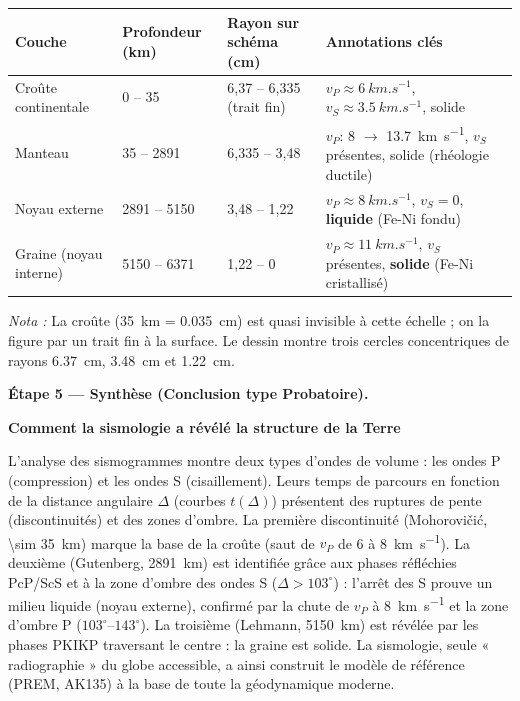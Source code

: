 \documentclass[11pt]{article}
\begin{document}
\begin{exoresolu}
\begin{center}
\begin{tabularx}{\linewidth}{|l|X|X|X|}
\hline
\rowcolor{popblueL} \textbf{Couche} & \textbf{Profondeur (km)} & \textbf{Rayon sur schéma (cm)} & \textbf{Annotations clés} \\
\hline
Croûte continentale & 0 -- 35 & 6,37 -- 6,335 (trait fin) & $v_P \approx \SI{6}{km.s^{-1}}$, $v_S \approx \SI{3,5}{km.s^{-1}}$, solide \\
\hline
Manteau & 35 -- 2891 & 6,335 -- 3,48 & $v_P$: \num{8} $\to$ \SI{13,7}{km.s^{-1}}, $v_S$ présentes, solide (rhéologie ductile) \\
\hline
Noyau externe & 2891 -- 5150 & 3,48 -- 1,22 & $v_P \approx \SI{8}{km.s^{-1}}$, $v_S = 0$, \textbf{liquide} (Fe-Ni fondu) \\
\hline
Graine (noyau interne) & 5150 -- 6371 & 1,22 -- 0 & $v_P \approx \SI{11}{km.s^{-1}}$, $v_S$ présentes, \textbf{solide} (Fe-Ni cristallisé) \\
\hline
\end{tabularx}
\end{center}
\textit{Nota :} La croûte (\SI{35}{km} = \SI{0,035}{cm}) est quasi invisible à cette échelle ; on la figure par un trait fin à la surface. Le dessin montre trois cercles concentriques de rayons \SI{6,37}{cm}, \SI{3,48}{cm} et \SI{1,22}{cm}.

\textbf{Étape 5 — Synthèse (Conclusion type Probatoire).}

\textbf{Comment la sismologie a révélé la structure de la Terre}

L'analyse des sismogrammes montre deux types d'ondes de volume : les ondes P (compression) et les ondes S (cisaillement). Leurs temps de parcours en fonction de la distance angulaire $\Delta$ (courbes $t(\Delta)$) présentent des ruptures de pente (discontinuités) et des zones d'ombre. La première discontinuité (Mohorovičić, \SI{\sim 35}{km}) marque la base de la croûte (saut de $v_P$ de 6 à \SI{8}{km.s^{-1}}). La deuxième (Gutenberg, \SI{2891}{km}) est identifiée grâce aux phases réfléchies PcP/ScS et à la zone d'ombre des ondes S ($\Delta > 103^\circ$) : l'arrêt des S prouve un milieu liquide (noyau externe), confirmé par la chute de $v_P$ à \SI{8}{km.s^{-1}} et la zone d'ombre P ($103^\circ$--$143^\circ$). La troisième (Lehmann, \SI{5150}{km}) est révélée par les phases PKIKP traversant le centre : la graine est solide. La sismologie, seule « radiographie » du globe accessible, a ainsi construit le modèle de référence (PREM, AK135) à la base de toute la géodynamique moderne.
\end{exoresolu}
\end{document}
